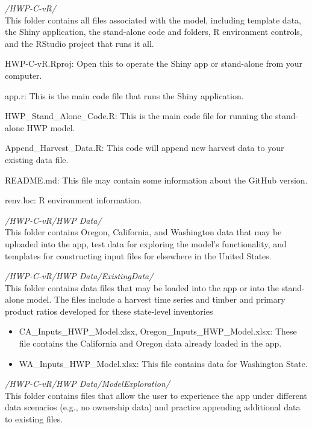 \documentclass[
  openany]{book}
\begin{document}
\emph{/HWP-C-vR/}\\
This folder contains all files associated with the model, including template data, the Shiny application, the stand-alone code and folders, R environment controls, and the RStudio project that runs it all.

HWP-C-vR.Rproj: Open this to operate the Shiny app or stand-alone from your computer.

app.r: This is the main code file that runs the Shiny application.

HWP\_Stand\_Alone\_Code.R: This is the main code file for running the stand-alone HWP model.

Append\_Harvest\_Data.R: This code will append new harvest data to your existing data file.

README.md: This file may contain some information about the GitHub version.

renv.loc: R environment information.

\emph{/HWP-C-vR/HWP Data/}\\
This folder contains Oregon, California, and Washington data that may be uploaded into the app, test data for exploring the model's functionality, and templates for constructing input files for elsewhere in the United States.

\emph{/HWP-C-vR/HWP Data/ExistingData/}\\
This folder contains data files that may be loaded into the app or into the stand-alone model. The files include a harvest time series and timber and primary product ratios developed for these state-level inventories

\begin{itemize}
\item
  CA\_Inputs\_HWP\_Model.xlsx, Oregon\_Inputs\_HWP\_Model.xlsx: These file contains the California and Oregon data already loaded in the app.
\item
  WA\_Inputs\_HWP\_Model.xlsx: This file contains data for Washington State.
\end{itemize}

\emph{/HWP-C-vR/HWP Data/ModelExploration/}\\
This folder contains files that allow the user to experience the app under different data scenarios (e.g., no ownership data) and practice appending additional data to existing files.
\end{document}
